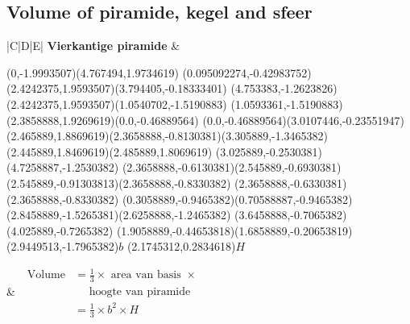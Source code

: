 \subsection{Volume of piramide, kegel and sfeer}


\begin{table}[H]
\begin{tabular}{|C|D|E|}
\hline
\textbf{Vierkantige piramide}
&
\begin{center}
\scalebox{1} %
{
\scalebox{1} %
{
\begin{pspicture}(0,-1.9993507)(4.767494,1.9734619)
\pspolygon[linewidth=0.028222222,fillstyle=solid](0.095092274,-0.42983752)(2.4242375,1.9593507)(3.794405,-0.18333401)
\pspolygon[linewidth=0.028222222,fillstyle=solid](4.753383,-1.2623826)(2.4242375,1.9593507)(1.0540702,-1.5190883)
\pspolygon[linewidth=0.028222222,fillstyle=solid](1.0593361,-1.5190883)(2.3858888,1.9269619)(0.0,-0.46889564)
\psline[linewidth=0.022cm,linestyle=dashed,dash=0.16cm 0.16cm](0.0,-0.46889564)(3.0107446,-0.23551947)
\psline[linewidth=0.027999999,linestyle=dotted,dotsep=0.16cm](2.465889,1.8869619)(2.3658888,-0.8130381)(3.305889,-1.3465382)(2.445889,1.8469619)(2.485889,1.8069619)
\psline[linewidth=0.024cm,linestyle=dashed,dash=0.16cm 0.16cm](3.025889,-0.2530381)(4.7258887,-1.2530382)
\psline[linewidth=0.02](2.3658888,-0.6130381)(2.545889,-0.6930381)(2.545889,-0.91303813)(2.3658888,-0.8330382)
\psline[linewidth=0.02cm](2.3658888,-0.6330381)(2.3658888,-0.8330382)
\psline[linewidth=0.04cm](0.3058889,-0.9465382)(0.70588887,-0.9465382)
\psline[linewidth=0.04cm](2.8458889,-1.5265381)(2.6258888,-1.2465382)
\psline[linewidth=0.04cm](3.6458888,-0.7065382)(4.025889,-0.7265382)
\psline[linewidth=0.04cm](1.9058889,-0.44653818)(1.6858889,-0.20653819)
\rput(2.9449513,-1.7965382){$b$}
\rput(2.1745312,0.2834618){$H$}
\end{pspicture} 
}

}
\end{center} 
&
$\begin{aligned}
\mbox{ Volume} &=  \frac{1}{3} \times \mbox{ area van basis } \times\\
&~~~~~~ \mbox{hoogte van piramide }\\
&=\frac{1}{3}\times b^{2} \times H
 \end{aligned}$
\\ \hline



\end{tabular}
\end{table}
